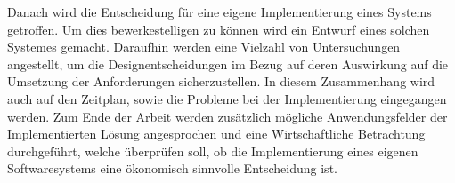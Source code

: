 Danach wird die Entscheidung für eine eigene Implementierung eines Systems getroffen.
Um dies bewerkestelligen zu können wird ein Entwurf eines solchen Systemes gemacht.
Daraufhin werden eine Vielzahl von Untersuchungen angestellt, um die Designentscheidungen im Bezug auf deren Auswirkung auf die Umsetzung der Anforderungen sicherzustellen.
In diesem Zusammenhang wird auch auf den Zeitplan, sowie die Probleme bei der Implementierung eingegangen werden.
Zum Ende der Arbeit werden zusätzlich mögliche Anwendungsfelder der Implementierten Lösung angesprochen und eine Wirtschaftliche Betrachtung durchgeführt, welche überprüfen soll, ob die Implementierung eines eigenen Softwaresystems eine ökonomisch sinnvolle Entscheidung ist.\\
